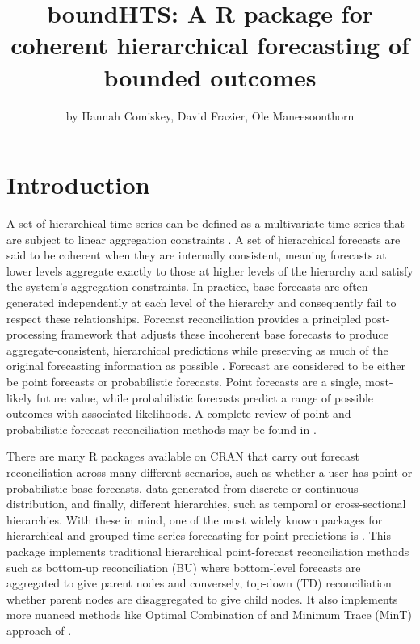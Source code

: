 \title{boundHTS: A R package for coherent hierarchical forecasting of bounded outcomes}


\author{by Hannah Comiskey, David Frazier, Ole Maneesoonthorn}

\maketitle


\section{Introduction}\label{introduction}

A set of hierarchical time series can be defined as a multivariate time series that are subject to linear aggregation constraints \citep{Hyndman2022}. A set of hierarchical forecasts are said to be coherent when they are internally consistent, meaning forecasts at lower levels aggregate exactly to those at higher levels of the hierarchy and satisfy the system's aggregation constraints. In practice, base forecasts are often generated independently at each level of the hierarchy and consequently fail to respect these relationships. Forecast reconciliation provides a principled post-processing framework that adjusts these incoherent base forecasts to produce aggregate-consistent, hierarchical predictions while preserving as much of the original forecasting information as possible \citep{Hyndman2021}. Forecast are considered to be either be point forecasts or probabilistic forecasts. Point forecasts are a single, most-likely future value, while probabilistic forecasts predict a range of possible outcomes with associated likelihoods. A complete review of point and probabilistic forecast reconciliation methods may be found in \citet{Athanasopoulos2024}.

There are many R packages available on CRAN that carry out forecast reconciliation across many different scenarios, such as whether a user has point or probabilistic base forecasts, data generated from discrete or continuous distribution, and finally, different hierarchies, such as temporal or cross-sectional hierarchies. With these in mind, one of the most widely known packages for hierarchical and grouped time series forecasting for point predictions is . This package implements traditional hierarchical point-forecast reconciliation methods such as bottom-up reconciliation (BU) where bottom-level forecasts are aggregated to give parent nodes and conversely, top-down (TD) reconciliation whether parent nodes are disaggregated to give child nodes. It also implements more nuanced methods like Optimal Combination of \citet{Hyndman2011} and Minimum Trace (MinT) approach of \citet{Wickramasuriya2019}.

